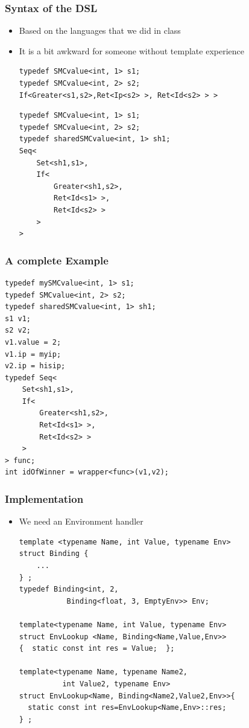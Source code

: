 \documentclass{beamer}
\begin{document}
\begin{frame}[fragile]
\frametitle{Syntax of the DSL}
\begin{itemize}
\item Based on the languages that we did in class
\item It is a bit awkward for someone without template experience
\begin{lstlisting}
typedef SMCvalue<int, 1> s1;
typedef SMCvalue<int, 2> s2;
If<Greater<s1,s2>,Ret<Ip<s2> >, Ret<Id<s2> > >
\end{lstlisting}
\begin{lstlisting}
typedef SMCvalue<int, 1> s1;
typedef SMCvalue<int, 2> s2;
typedef sharedSMCvalue<int, 1> sh1;
Seq<
    Set<sh1,s1>,
    If<
        Greater<sh1,s2>,
        Ret<Id<s1> >,
        Ret<Id<s2> >
    >
>
\end{lstlisting}
\end{itemize}
\end{frame}

\begin{frame}[fragile]
\frametitle{A complete Example}
\begin{lstlisting}
typedef mySMCvalue<int, 1> s1;
typedef SMCvalue<int, 2> s2;
typedef sharedSMCvalue<int, 1> sh1;
s1 v1;
s2 v2;
v1.value = 2;
v1.ip = myip;
v2.ip = hisip;
typedef Seq<
    Set<sh1,s1>,
    If<
        Greater<sh1,s2>,
        Ret<Id<s1> >,
        Ret<Id<s2> >
    >
> func;
int idOfWinner = wrapper<func>(v1,v2);
\end{lstlisting}
\end{frame}

\begin{frame}[fragile]
\frametitle{Implementation}
\begin{itemize}
\item We need an Environment handler
\begin{lstlisting}
template <typename Name, int Value, typename Env>
struct Binding {
    ...
} ;
typedef Binding<int, 2,
           Binding<float, 3, EmptyEnv>> Env;
           
template<typename Name, int Value, typename Env>
struct EnvLookup <Name, Binding<Name,Value,Env>> 
{  static const int res = Value;  };

template<typename Name, typename Name2,
          int Value2, typename Env>
struct EnvLookup<Name, Binding<Name2,Value2,Env>>{
  static const int res=EnvLookup<Name,Env>::res;
} ;
\end{lstlisting}
\end{itemize}
\end{frame}
\end{document}
